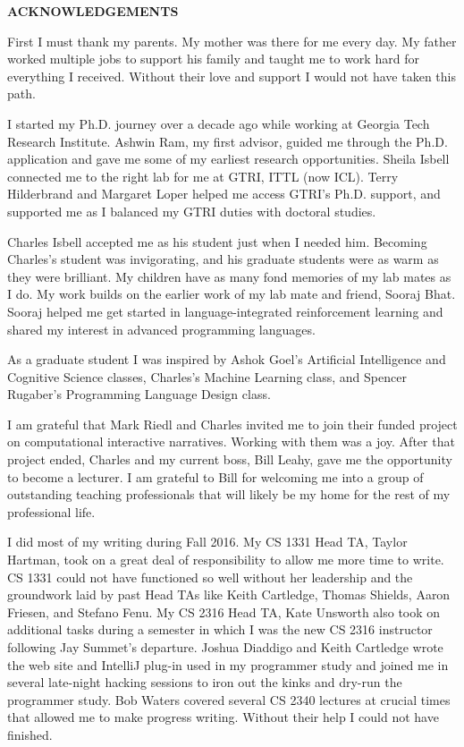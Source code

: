 \clearpage
\begin{centering}
\textbf{ACKNOWLEDGEMENTS}\\
\vspace{\baselineskip}
\end{centering}


First I must thank my parents. My mother was there for me every day. My father worked multiple jobs to support his family and taught me to work hard for everything I received. Without their love and support I would not have taken this path.

I started my Ph.D. journey over a decade ago while working at Georgia Tech Research Institute. Ashwin Ram, my first advisor, guided me through the Ph.D. application and gave me some of my earliest research opportunities. Sheila Isbell connected me to the right lab for me at GTRI, ITTL (now ICL). Terry Hilderbrand and Margaret Loper helped me access GTRI's Ph.D. support, and supported me as I balanced my GTRI duties with doctoral studies.

Charles Isbell accepted me as his student just when I needed him. Becoming Charles's student was invigorating, and his graduate students were as warm as they were brilliant. My children have as many fond memories of my lab mates as I do. My work builds on the earlier work of my lab mate and friend, Sooraj Bhat. Sooraj helped me get started in language-integrated reinforcement learning and shared my interest in advanced programming languages.

As a graduate student I was inspired by Ashok Goel's Artificial Intelligence and Cognitive Science classes, Charles's Machine Learning class, and Spencer Rugaber's Programming Language Design class.

I am grateful that Mark Riedl and Charles invited me to join their funded project on computational interactive narratives. Working with them was a joy. After that project ended, Charles and my current boss, Bill Leahy, gave me the opportunity to become a lecturer. I am grateful to Bill for welcoming me into a group of outstanding teaching professionals that will likely be my home for the rest of my professional life.

\newpage

I did most of my writing during Fall 2016. My CS 1331 Head TA, Taylor Hartman, took on a great deal of responsibility to allow me more time to write. CS 1331 could not have functioned so well without her leadership and the groundwork laid by past Head TAs like Keith Cartledge, Thomas Shields, Aaron Friesen, and Stefano Fenu. My CS 2316 Head TA, Kate Unsworth also took on additional tasks during a semester in which I was the new CS 2316 instructor following Jay Summet's departure. Joshua Diaddigo and Keith Cartledge wrote the web site and IntelliJ plug-in used in my programmer study and joined me in several late-night hacking sessions to iron out the kinks and dry-run the programmer study. Bob Waters covered several CS 2340 lectures at crucial times that allowed me to make progress writing. Without their help I could not have finished.

